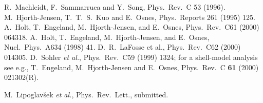 \begin{thebibliography}{200}
 R.\ Machleidt, F.\ Sammarruca and Y.\ Song,
Phys.\ Rev.\ C 53 (1996).
  M.\ Hjorth-Jensen, T.\ T.\ S.\ Kuo and
E.\ Osnes, Phys.\ Reports 261 (1995) 125.
 A.~Holt, T.~Engeland, M.~Hjorth-Jensen, and E.~Osnes,
                 Phys.~Rev.~C61 (2000) 064318.
 A.~Holt, T.~Engeland, M.~Hjorth-Jensen, and E.~Osnes,
                 Nucl.~Phys.~A634 (1998) 41.
 D.~R.~LaFosse et al., Phys.~Rev.~C62 (2000) 014305.  
 D.~Sohler {\em et al.}, Phys.~Rev.~C59 (1999) 1324; for a
shell-model analysis see e.g., 
T.~Engeland, M.~Hjorth-Jensen and E.~Osnes, 
Phys.~Rev.~C {\bf 61} (2000) 021302(R).

M.~Lipoglav\v{s}ek {\em et al.}, Phys.\ Rev.\ Lett., submitted.

\end{thebibliography}










  

